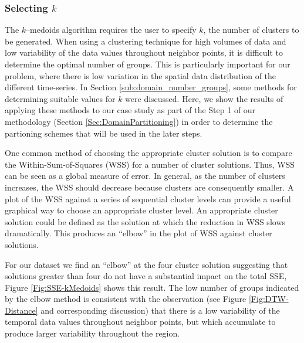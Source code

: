 
\subsubsection{Selecting $k$}
\label{Sec:Selectk}

The $k$--medoids algorithm requires the user to specify $k$, the number of clusters to be generated. When using a clustering technique for high volumes of data and low variability of the data values throughout neighbor points, it is difficult to determine the optimal number of groups. This is particularly important for our problem, where there is low variation in the spatial data distribution of the different time-series. In Section \ref{sub:domain_number_groups}, some methods for determining suitable values for $k$ were discussed. Here, we show the results of applying these methods to our case study as part of the Step 1 of our methodology (Section \ref{Sec:DomainPartitioning}) in order to determine the partioning schemes that will be used in the later steps.

One common method of choosing the appropriate cluster solution is to compare the Within-Sum-of-Squares (WSS) for a number of cluster solutions. Thus, WSS can be seen as a global measure of error. In general, as the number of clusters increases, the WSS should decrease because clusters are consequently smaller. A plot of the WSS against a series of sequential cluster levels can provide a useful graphical way to choose an appropriate cluster level. An appropriate cluster solution could be defined as the solution at which the reduction in WSS slows dramatically. This produces an ``elbow'' in the plot of WSS against cluster solutions. 

For our dataset we find an ``elbow'' at the four cluster solution suggesting that solutions greater than four do not have a substantial impact on the total SSE, Figure \ref{Fig:SSE-kMedoids} shows this result. The low number of groups indicated by the elbow method is consistent with the observation (see Figure 
\ref{Fig:DTW-Distance} and corresponding discussion) that there is a low variability of the temporal data values throughout neighbor points, but which accumulate to produce larger variability throughout the region.

